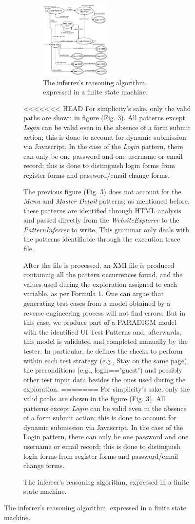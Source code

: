 \documentclass[conference]{IEEEtran}
\begin{document}
\begin{enumerate}
\begin{figure}[!htb]
\begin{itemize}
\begin{figure}[!htb]
\begin{itemize}
\begin{figure}[!htb]
\centering
\includegraphics[width=0.5\textwidth]{Global_State_Machine.pdf}
\caption{The inferrer's reasoning algorithm, expressed in a finite state machine.}
\label{fig:inferrer}
\end{figure}

<<<<<<< HEAD
For simplicity's sake, only the valid paths are shown in figure (Fig. \ref{fig:inferrer}). All patterns except \textit{Login} can be valid even in the absence of a form submit action; this is done to account for dynamic submission via Javascript. In the case of the \textit{Login} pattern, there can only be one password and one username or email record; this is done to distinguish login forms from register forms and password/email change forms.

The previous figure (Fig. \ref{fig:inferrer}) does not account for the \textit{Menu} and \textit{Master Detail} patterns; as mentioned before, these patterns are identified through HTML analysis and passed directly from the \textit{WebsiteExplorer} to the \textit{PatternInferrer} to write. This grammar only deals with the patterns identifiable through the execution trace file.

After the file is processed, an XMI file is produced containing all the pattern occurrences found, and the values used during the exploration assigned to each variable, as per Formula 1. %
One can argue that generating test cases from a model obtained by a reverse engineering process will not find errors. But in this case, we produce part of a PARADIGM model with the identified UI Test Patterns and, afterwards, this model is validated and completed manually by the tester. In particular, he defines the checks to perform within each test strategy (e.g., Stay on the same page), the preconditions (e.g., login=="guest") and possibly other test input data besides the ones used during the exploration.
=======
For simplicity's sake, only the valid paths are shown in the figure (Fig. \ref{fig:inferrer}). All patterns except \textit{Login} can be valid even in the absence of a form submit action; this is done to account for dynamic submission via Javascript. In the case of the Login pattern, there can only be one password and one username or email record; this is done to distinguish login forms from register forms and password/email change forms.\\


\end{itemize}
\end{figure}
\end{itemize}
\end{figure}
\end{enumerate}
\end{document}
